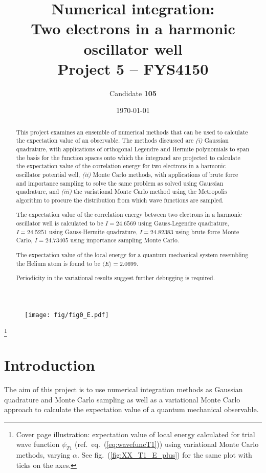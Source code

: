 \documentclass[a4paper,11pt]{article}
\date{\today}
\title{Numerical integration:\\ Two electrons in a harmonic oscillator well\\ \small{Project 5 -- FYS4150}}
\author{Candidate \textbf{105}}
\begin{document}
\onecolumn
\maketitle{}
\begin{figure}[htbp]
    \centering
    \texttt{[image: fig/fig0\_E.pdf]}
\end{figure}

\begin{abstract}
    This project examines an ensemble of numerical methods that can be used to calculate the expectation value of an observable. The methods discussed are \textit{(i)} Gaussian quadrature, with applications of orthogonal Legendre and Hermite polynomials to span the basis for the function spaces onto which the integrand are projected to calculate the expectation value of the correlation energy for two electrons in a harmonic oscillator potential well, \textit{(ii)}  Monte Carlo methods, with applications of brute force and importance sampling to solve the same problem as solved using Gaussian quadrature, and \textit{(iii)} the variational Monte Carlo method using the Metropolis algorithm to procure the distribution from which wave functions are sampled.

    The expectation value of the correlation energy between two electrons in a harmonic oscillator well is calculated to be $I=24.6569$ using Gauss-Legendre quadrature, $I=24.5251$ using Gauss-Hermite quadrature, $I=24.82383$ using brute force Monte Carlo, $I=24.73405$ using importance sampling Monte Carlo.

    The expectation value of the local energy for a quantum mechanical system resembling the Helium atom is found to be $\langle E \rangle = 2.0699$.

    Periodicity in the variational results suggest further debugging is required.
\end{abstract}

\newpage
{}\footnote{Cover page illustration: expectation value of local energy calculated for trial wave function $\psi_{T1}$ (ref.~eq.~(\ref{eq:wavefuncT1})) using variational Monte Carlo methods, varying $\alpha$. See fig.~(\ref{fig:XX_T1_E_plus}) for the same plot with ticks on the axes. }
\newpage
\section{Introduction}

The aim of this project is to use numerical integration methods as Gaussian quadrature and Monte Carlo sampling as well as a variational Monte Carlo approach to calculate the expectation value of a quantum mechanical observable.
\end{document}
